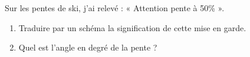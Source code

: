 
Sur les pentes de ski, j'ai relevé : « Attention pente à 50\% ». 
\begin{enumerate}
\item Traduire par un schéma la signification de cette mise en garde.
\item Quel est l'angle en degré de la pente ?
\end{enumerate}
